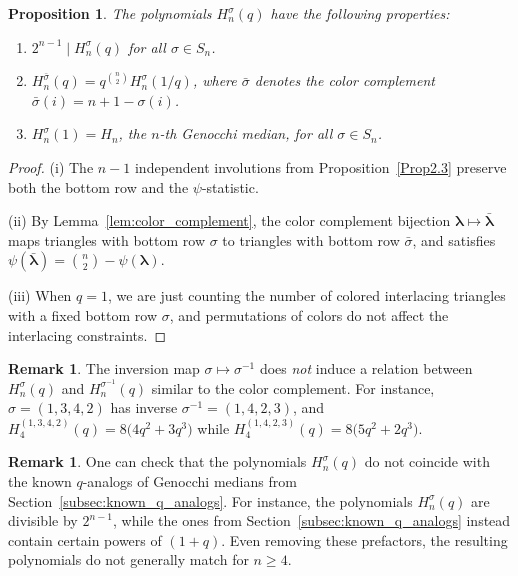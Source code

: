 \documentclass[pdftex]{sigma}
\numberwithin{equation}{section}
\newtheorem{Proposition}[Theorem]{Proposition}
\theoremstyle{definition}
\newtheorem{Remark}[Theorem]{Remark}
\begin{document}
\begin{Proposition}\label{prop:H_sigma_properties} The polynomials $H_n^\sigma(q)$ have the
	following properties:
	\begin{enumerate}[\rm (i)]\itemsep=0pt
		\item $2^{n-1} \mid H_n^\sigma(q)$ for all $\sigma \in S_n$.
		\item
		$H_n^{\bar\sigma}(q) = q^{\binom{n}{2}} H_n^\sigma(1/q)$, where
		$\bar\sigma$ denotes the color complement
		$\bar\sigma(i) = n+1-\sigma(i)$.
		\item $H_n^{\sigma}(1)=H_n$, the $n$-th Genocchi median, for all $\sigma \in S_n$.
	\end{enumerate}
\end{Proposition}
\begin{proof}
(i) The $n-1$ independent involutions from Proposition~\ref{Prop2.3}
		preserve both the bottom row and the $\psi$-statistic.

(ii) By Lemma~\ref{lem:color_complement}, the color complement bijection
		$\boldsymbol\lambda \mapsto \bar{\boldsymbol\lambda}$ maps triangles
		with bottom row $\sigma$ to triangles with bottom row $\bar\sigma$, and
		satisfies
		$\psi(\bar{\boldsymbol\lambda}) = \binom{n}{2} - \psi(\boldsymbol\lambda)$.

(iii) When $q=1$, we are just counting the number of colored interlacing triangles
		with a fixed bottom row $\sigma$, and permutations of colors do not
		affect the interlacing constraints.
\end{proof}

\begin{Remark}
	\label{rem:inverse_not_palindromic} The inversion map
	$\sigma \mapsto \sigma^{-1}$ does \emph{not} induce a relation between
	$H_n^\sigma(q)$ and $H_n^{\sigma^{-1}}(q)$ similar to the color complement.
	For instance, $\sigma = (1,3,4,2)$ has inverse $\sigma^{-1} = (1,4,2,3)$,
	and $H_4^{(1,3,4,2)}(q) = 8\bigl(4q^2 + 3q^3\bigr)$ while
	$H_4^{(1,4,2,3)}(q) = 8\bigl(5q^2 + 2q^3\bigr)$.
\end{Remark}

\begin{Remark}
	\label{rem:H_sigma_not_known} One can check that the polynomials
	$H_n^\sigma(q)$ do not coincide with the known $q$-analogs of Genocchi
	medians from Section~\ref{subsec:known_q_analogs}.
	For instance, the polynomials $H_n^\sigma(q)$ are divisible by $2^{n-1}$,
	while the ones from Section~\ref{subsec:known_q_analogs} instead contain certain
	powers of $(1+q)$.
	Even removing these prefactors, the resulting polynomials do not generally
	match for $n\ge4$.
\end{Remark}
\end{document}
